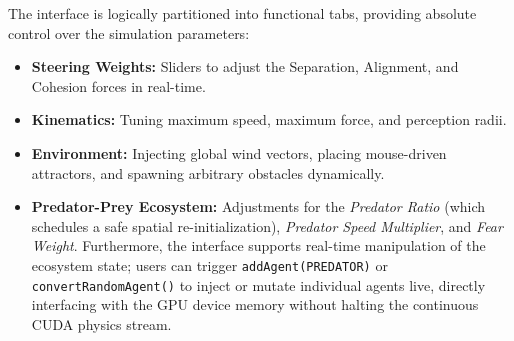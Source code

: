 \documentclass[12pt,a4paper]{report}
\begin{document}
The interface is logically partitioned into functional tabs, providing absolute control over the simulation parameters:
\begin{itemize}
    \item \textbf{Steering Weights:} Sliders to adjust the Separation, Alignment, and Cohesion forces in real-time.
    \item \textbf{Kinematics:} Tuning maximum speed, maximum force, and perception radii.
    \item \textbf{Environment:} Injecting global wind vectors, placing mouse-driven attractors, and spawning arbitrary obstacles dynamically.
    \item \textbf{Predator-Prey Ecosystem:} Adjustments for the \textit{Predator Ratio} (which schedules a safe spatial re-initialization), \textit{Predator Speed Multiplier}, and \textit{Fear Weight}. Furthermore, the interface supports real-time manipulation of the ecosystem state; users can trigger \texttt{addAgent(PREDATOR)} or \texttt{convertRandomAgent()} to inject or mutate individual agents live, directly interfacing with the GPU device memory without halting the continuous CUDA physics stream.
\end{itemize}
\end{document}
